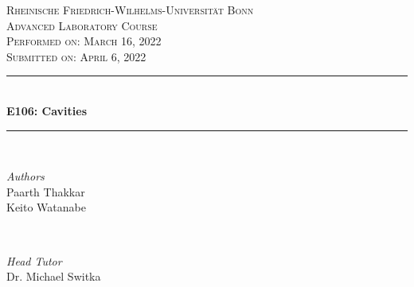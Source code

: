 \documentclass[a4paper]{report}
\numberwithin{equation}{section}
\begin{document}
\begin{titlepage} %
	\newcommand{\HRule}{\rule{\linewidth}{0.5mm}} %
	
	\center %
	
	\textsc{\LARGE Rheinische Friedrich-Wilhelms-Universit\"at Bonn }\\[4cm] %
	
	\textsc{\Large Advanced Laboratory Course}\\[0.5cm] %
	
	\textsc{\large Performed on: March 16, 2022}\\[0.5cm] %

	\textsc{\large Submitted on: April 6, 2022}\\[0.5cm] %
	
	
	\HRule\\[0.4cm]
	
	{\huge\bfseries E106: Cavities}\\[0.4cm] %
	
	\HRule\\[1.5cm]
	
	
	\begin{minipage}{0.4\textwidth}
		\begin{flushleft}
			\large
			\textit{Authors}\\
			Paarth Thakkar \\
			Keito Watanabe
		\end{flushleft}
	\end{minipage}
	~
	\begin{minipage}{0.4\textwidth}
		\begin{flushright}
			\large
			\textit{Head Tutor}\\
			Dr. Michael Switka
		\end{flushright}
	\end{minipage}


\end{titlepage}
\end{document}
